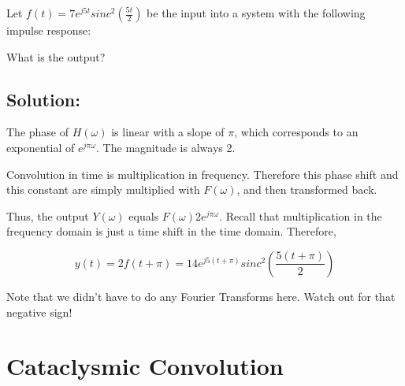 \documentclass{article}
\begin{document}
Let $f(t) = 7e^{j5t} sinc^2(\frac{5t}{2})$ be the input into a system with the following impulse response:


\begin{figure}[h!]
    \centering
\end{figure}


What is the output?

\subsection{Solution:}

The phase of $H(\omega)$ is linear with a slope of $\pi$, which corresponds to an exponential of $e^{j\pi \omega}$. The magnitude is always 2.

Convolution in time is multiplication in frequency. Therefore this phase shift and this constant are simply multiplied with $F(\omega)$, and then transformed back.

Thus, the output $Y(\omega)$ equals $F(\omega)2e^{j \pi \omega}$. Recall that multiplication in the frequency domain is just a time shift in the time domain. Therefore,

$$\boxed{y(t) = 2f(t + \pi) = 14e^{j5(t + \pi)} sinc^2 \left( \frac{5(t + \pi)}{2}\right)}$$

Note that we didn't have to do any Fourier Transforms here. Watch out for that negative sign!

\newpage
\section{Cataclysmic Convolution}
\end{document}
